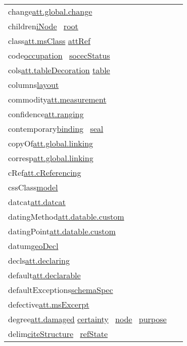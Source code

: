 \begin{longtable}{L{.2\textwidth}P{.8\textwidth}}
change\tabcellsep \hyperref[TEI.att.global.change]{att.global.change}\\
children\tabcellsep \hyperref[TEI.iNode]{iNode}  \hyperref[TEI.root]{root} \\
class\tabcellsep \hyperref[TEI.att.msClass]{att.msClass} \hyperref[TEI.attRef]{attRef} \\
code\tabcellsep \hyperref[TEI.occupation]{occupation}  \hyperref[TEI.socecStatus]{socecStatus} \\
cols\tabcellsep \hyperref[TEI.att.tableDecoration]{att.tableDecoration} \hyperref[TEI.table]{table} \\
columns\tabcellsep \hyperref[TEI.layout]{layout} \\
commodity\tabcellsep \hyperref[TEI.att.measurement]{att.measurement}\\
confidence\tabcellsep \hyperref[TEI.att.ranging]{att.ranging}\\
contemporary\tabcellsep \hyperref[TEI.binding]{binding}  \hyperref[TEI.seal]{seal} \\
copyOf\tabcellsep \hyperref[TEI.att.global.linking]{att.global.linking}\\
corresp\tabcellsep \hyperref[TEI.att.global.linking]{att.global.linking}\\
cRef\tabcellsep \hyperref[TEI.att.cReferencing]{att.cReferencing}\\
cssClass\tabcellsep \hyperref[TEI.model]{model} \\
datcat\tabcellsep \hyperref[TEI.att.datcat]{att.datcat}\\
datingMethod\tabcellsep \hyperref[TEI.att.datable.custom]{att.datable.custom}\\
datingPoint\tabcellsep \hyperref[TEI.att.datable.custom]{att.datable.custom}\\
datum\tabcellsep \hyperref[TEI.geoDecl]{geoDecl} \\
decls\tabcellsep \hyperref[TEI.att.declaring]{att.declaring}\\
default\tabcellsep \hyperref[TEI.att.declarable]{att.declarable}\\
defaultExceptions\tabcellsep \hyperref[TEI.schemaSpec]{schemaSpec} \\
defective\tabcellsep \hyperref[TEI.att.msExcerpt]{att.msExcerpt}\\
degree\tabcellsep \hyperref[TEI.att.damaged]{att.damaged} \hyperref[TEI.certainty]{certainty}  \hyperref[TEI.node]{node}  \hyperref[TEI.purpose]{purpose} \\
delim\tabcellsep \hyperref[TEI.citeStructure]{citeStructure}  \hyperref[TEI.refState]{refState} \\

\end{longtable}
